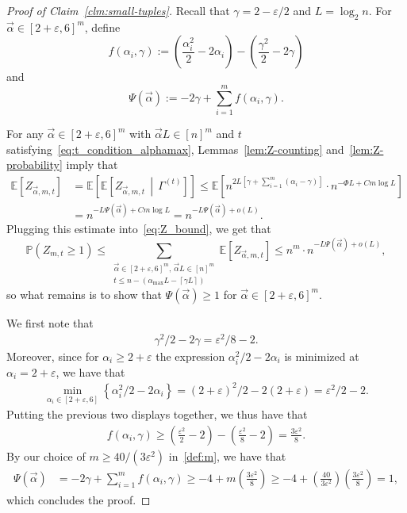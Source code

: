 \documentclass[11pt]{article}
\theoremstyle{plain}
\theoremstyle{definition}
\theoremstyle{remark}
\newcommand{\avec}{\vec{\alpha}}
\newcommand{\E}{\mathbb{E}}
\newcommand{\eps}{\varepsilon}
\renewcommand{\Pr}{\mathbb{P}}
\begin{document}
\begin{proof}[Proof of Claim~\ref{clm:small-tuples}]
    Recall that $\gamma = 2 - \eps/2$ and $L = \log_2 n$. 
    For $\avec \in [2 + \eps, 6]^m$, define 
    \[
    f(\alpha_i, \gamma) := \left(\frac{\alpha_i^2}{2} - 2 \alpha_i\right) - \left(\frac{\gamma^2}{2} - 2\gamma\right)
    \]
    and 
    \[
    \Psi(\avec) := -2\gamma +\sum_{i = 1}^m f(\alpha_i, \gamma). 
    \]
    
    
    For any $\avec \in [2 + \eps, 6]^m$ with $\avec L \in [n]^m$ and $t$ satisfying~\eqref{eq:t_condition_alphamax}, Lemmas~\ref{lem:Z-counting} and~\ref{lem:Z-probability} imply that
    \begin{align*}
        \E \left[ Z_{\avec, m, t} \right] 
        &= \E\left[ \E \left[ Z_{\avec, m, t} \, \middle| \, \Gamma^{(t)} \right] \right] 
        \leq \E \left[ n^{2L \left[\gamma + \sum_{i=1}^m(\alpha_i - \gamma)\right]} \cdot n^{-\Phi L + C m \log L} \right] \\
        &= n^{-L \Psi(\avec) + C m \log L}
        = n^{-L \Psi(\avec) + o(L)}.
    \end{align*}
    Plugging this estimate into~\eqref{eq:Z_bound}, we get that 
    \[
    \Pr(Z_{m,t} \geq 1) 
    \leq \sum_{\substack{\avec \in [2+\eps, 6]^m, \, \avec L \in [n]^m \\ t \leq n - (\alpha_{\max} L - \left\lceil \gamma L \right\rceil)}} \E \left[Z_{\avec, m, t} \right] 
    \leq n^{m} \cdot n^{-L \Psi(\avec) + o(L)},
    \]
    so what remains is to show that $\Psi(\avec) \geq 1$ for $\avec \in [2 + \eps, 6]^m$. 
    
    We first note that
    \begin{align*}
        \gamma^2 / 2 - 2\gamma = \eps^{2} / 8 - 2.
    \end{align*}
    Moreover, since for $\alpha_i \geq 2 + \eps$ the expression $\alpha_i^2/2 - 2\alpha_i$ is minimized at $\alpha_i = 2 + \eps$, we have that
    \begin{align*}
        \min_{\alpha_i \in [2 + \eps, 6]} \left\{\alpha_i^2/2 - 2\alpha_i \right\} = (2+ \eps)^2/2 - 2(2 + \eps) = \eps^2/2 - 2.
    \end{align*}
    Putting the previous two displays together, we thus have that 
    \begin{align*}
        f(\alpha_i, \gamma) \geq \left(\frac{\eps^2}{2} - 2\right) - \left(\frac{\eps^2}{8} - 2\right) = \frac{3\eps^2}{8}.
    \end{align*}
    By our choice of $m \geq 40/(3\eps^2)$ in~\eqref{def:m}, we have that 
    \begin{align*}
        \Psi(\avec) &= -2\gamma + \sum_{i=1}^m f(\alpha_i, \gamma) \geq -4 + m\left(\frac{3\eps^2}{8}\right) \geq -4 + \left(\frac{40}{3\eps^2}\right)\left(\frac{3\eps^2}{8}\right) = 1,
    \end{align*}
    which concludes the proof. 
\end{proof}
\end{document}
